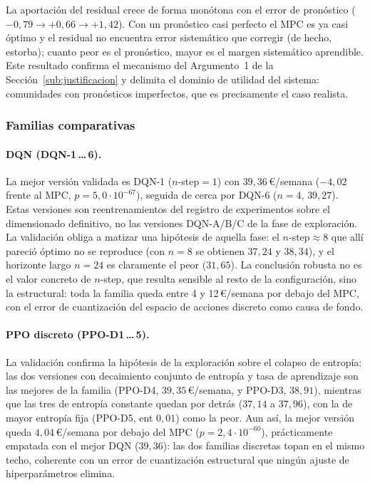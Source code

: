 \documentclass[12pt, a4paper, twoside]{report}
\begin{document}
La aportación del residual crece de forma monótona con el error de pronóstico
($-0{,}79 \rightarrow +0{,}66 \rightarrow +1{,}42$). Con un pronóstico casi
perfecto el MPC es ya casi óptimo y el residual no encuentra error sistemático
que corregir (de hecho, estorba); cuanto peor es el pronóstico, mayor es el
margen sistemático aprendible. Este resultado confirma el mecanismo del
Argumento~1 de la Sección~\ref{sub:justificacion} y delimita el dominio de
utilidad del sistema: comunidades con pronósticos imperfectos, que es
precisamente el caso realista.

\subsubsection{Familias comparativas}

\paragraph{DQN (DQN-1\,\ldots\,6).} La mejor versión validada es DQN-1
($n$-step${}=1$) con $39{,}36$\,€/semana ($-4{,}02$ frente al MPC,
$p=5{,}0\cdot10^{-67}$), seguida de cerca por DQN-6 ($n{=}4$, $39{,}27$).
Estas versiones son reentrenamientos del registro de experimentos sobre el
dimensionado definitivo, no las versiones DQN-A/B/C de la fase de exploración.
La validación obliga a matizar una hipótesis de aquella fase: el
$n$-step${}\approx 8$ que allí pareció óptimo no se reproduce (con $n{=}8$ se
obtienen $37{,}24$ y $38{,}34$), y el horizonte largo $n{=}24$ es claramente el
peor ($31{,}65$). La conclusión robusta no es el valor concreto de $n$-step,
que resulta sensible al resto de la configuración, sino la estructural: toda
la familia queda entre 4 y 12\,€/semana por debajo del MPC, con el error de
cuantización del espacio de acciones discreto como causa de fondo.

\paragraph{PPO discreto (PPO-D1\,\ldots\,5).} La validación confirma la
hipótesis de la exploración sobre el colapso de entropía: las dos versiones
con decaimiento conjunto de entropía y tasa de aprendizaje son las mejores de
la familia (PPO-D4, $39{,}35$\,€/semana, y PPO-D3, $38{,}91$), mientras que
las tres de entropía constante quedan por detrás ($37{,}14$ a $37{,}96$), con
la de mayor entropía fija (PPO-D5, ent $0{,}01$) como la peor. Aun así, la
mejor versión queda $4{,}04$\,€/semana por debajo del MPC
($p=2{,}4\cdot10^{-60}$), prácticamente empatada con el mejor DQN ($39{,}36$):
las dos familias discretas topan en el mismo techo, coherente con un error de
cuantización estructural que ningún ajuste de hiperparámetros elimina.
\end{document}
